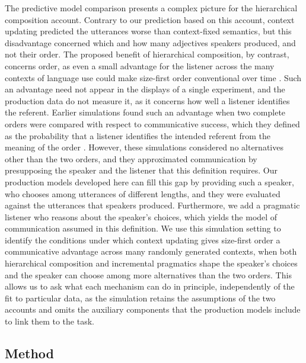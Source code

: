 \documentclass[10pt,a4paper,fleqn]{article}
\begin{document}
The predictive model comparison presents a complex picture for the hierarchical composition account.
Contrary to our prediction based on this account, context updating predicted the utterances worse than context-fixed semantics, but this disadvantage concerned which and how many adjectives speakers produced, and not their order.
The proposed benefit of hierarchical composition, by contrast, concerns order, as even a small advantage for the listener across the many contexts of language use could make size-first order conventional over time \citep[p.~7:19]{scontras2019grammatical}.
Such an advantage need not appear in the displays of a single experiment, and the production data do not measure it, as it concerns how well a listener identifies the referent.
Earlier simulations found such an advantage when two complete orders were compared with respect to communicative success, which they defined as the probability that a listener identifies the intended referent from the meaning of the order \citep{franke2019subjectivity}.
However, these simulations considered no alternatives other than the two orders, and they approximated communication by presupposing the speaker and the listener that this definition requires.
Our production models developed here can fill this gap by providing such a speaker, who chooses among utterances of different lengths, and they were evaluated against the utterances that speakers produced.
Furthermore, we add a pragmatic listener who reasons about the speaker's choices, which yields the model of communication assumed in this definition.
We use this simulation setting to identify the conditions under which context updating gives size-first order a communicative advantage across many randomly generated contexts, when both hierarchical composition and incremental pragmatics shape the speaker's choices and the speaker can choose among more alternatives than the two orders.
This allows us to ask what each mechanism can do in principle, independently of the fit to particular data, as the simulation retains the assumptions of the two accounts and omits the auxiliary components that the production models include to link them to the task.

\subsection{Method}
\label{sec:simulation:boundary}
\end{document}
